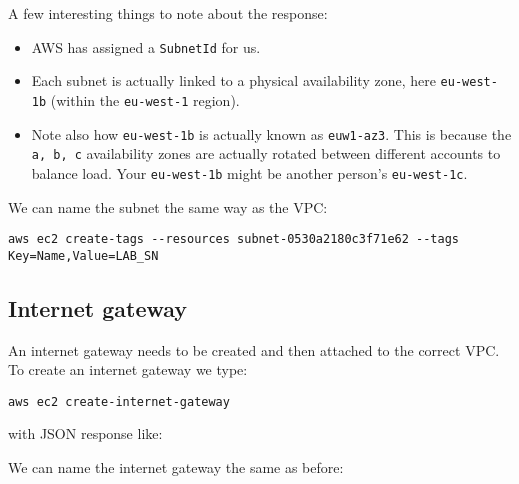 A few interesting things to note about the response:

\begin{itemize}
\item
  AWS has assigned a \texttt{SubnetId} for us.
\item
  Each subnet is actually linked to a physical availability zone, here
  \texttt{eu-west-1b} (within the \texttt{eu-west-1} region).
\item
  Note also how \texttt{eu-west-1b} is actually known as
  \texttt{euw1-az3}. This is because the \texttt{a,\ b,\ c} availability
  zones are actually rotated between different accounts to balance load.
  Your \texttt{eu-west-1b} might be another person's
  \texttt{eu-west-1c}.
\end{itemize}

We can name the subnet the same way as the VPC:

\begin{verbatim}
aws ec2 create-tags --resources subnet-0530a2180c3f71e62 --tags Key=Name,Value=LAB_SN
\end{verbatim}

\subsection{Internet gateway}\label{internet-gateway}

An internet gateway needs to be created and then attached to the correct
VPC. To create an internet gateway we type:

\begin{verbatim}
aws ec2 create-internet-gateway
\end{verbatim}

with JSON response like:

\begin{Shaded}
\begin{Highlighting}[]
\FunctionTok{\{}
    \FunctionTok{:} \FunctionTok{\{}
        \FunctionTok{:} \OtherTok{[]}\FunctionTok{,}
        \FunctionTok{:} \FunctionTok{,}
        \FunctionTok{:} \FunctionTok{,}
        \FunctionTok{:} \OtherTok{[]}
    \FunctionTok{\}}
\FunctionTok{\}}
\end{Highlighting}
\end{Shaded}

We can name the internet gateway the same as before:

